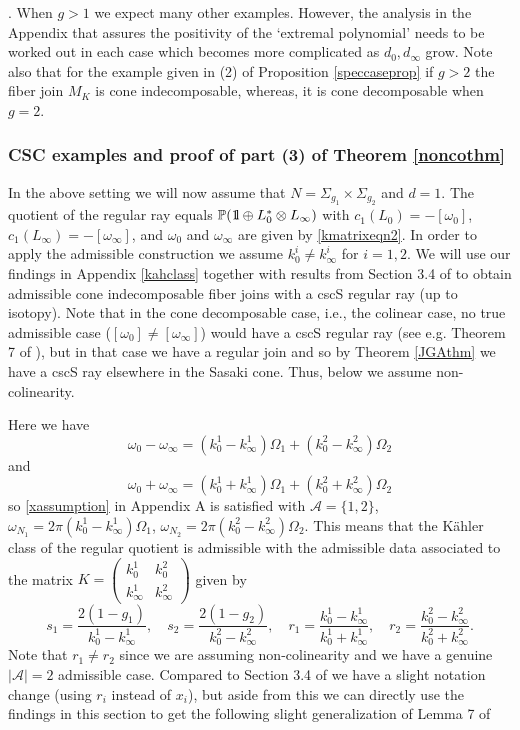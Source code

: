 \documentclass[12pt]{amsart}
\newenvironment{remark}{\medskip \refstepcounter{theorem}
\noindent  {\bf Remark \thetheorem}.\rm}{\,}
\renewcommand{\thetheorem}{\thesection.\arabic{theorem}}
\def\BOne{{\mathchoice {\rm 1\mskip-4mu l} {\rm 1\mskip-4mu l}
                          {\rm 1\mskip-4.5mu l} {\rm 1\mskip-5mu l}}}
\def\bbp{{\mathbb P}}
\def\grO{\Omega}
\def\grS{\Sigma}
\def\cala{{\mathcal A}}
\begin{document}
\begin{remark}\label{genusrem}
When $g>1$ we expect many other examples. However, the analysis in the Appendix that assures the positivity of the `extremal polynomial' needs to be worked out in each case which becomes more complicated as $d_0,d_\infty$ grow. 
Note also that for the example given in (2) of Proposition \ref{speccaseprop} if $g>2$ the fiber join $M_K$ is cone indecomposable, whereas, it is cone decomposable when $g=2$. 
\end{remark}

\subsubsection{CSC examples and proof of part (3) of Theorem \ref{noncothm}}
In the above setting we will now assume that $N=\grS_{g_1}\times \grS_{g_2}$ and $d=1$. The quotient of the regular ray equals
$\bbp(\BOne \oplus L^*_0\otimes L_\infty)$ with $c_1(L_0)=-[\omega_0]$, $c_1(L_\infty)=-[\omega_\infty]$, and $\omega_0$ and $\omega_\infty$ are given by \eqref{kmatrixeqn2}. In order to apply the admissible construction we assume $k^i_0\neq k^i_\infty$ for $i=1,2$. We will use our findings in Appendix \ref{kahclass} together with results from Section 3.4 of \cite{ACGT08} to obtain admissible cone indecomposable fiber joins with a cscS regular ray (up to isotopy). Note that in the cone decomposable case, i.e., the colinear case, no true admissible case ($[\omega_0]\neq [\omega_\infty]$) would have a cscS regular ray (see e.g. Theorem 7 of \cite{ACGT08}), but in that case we have a regular join and so by Theorem \ref{JGAthm} we have a cscS ray elsewhere in the Sasaki cone. 
Thus, below we assume non-colinearity.

Here we have 
$$\omega_0-\omega_\infty= (k^1_0-k^1_\infty)\grO_1 +(k^2_0-k^2_\infty)\grO_2$$
and
$$\omega_0+\omega_\infty= (k^1_0+k^1_\infty)\grO_1 +(k^2_0+k^2_\infty)\grO_2$$
so \eqref{xassumption} in Appendix A is satisfied with $\cala=\{1,2\}$,
$\omega_{N_1}= 2\pi (k^1_0-k^1_\infty)\grO_1$, $\omega_{N_2}= 2\pi(k^2_0-k^2_\infty)\grO_2$.
This means that the K\"ahler class of the regular quotient is admissible with the admissible data associated to the matrix 
$K= \begin{pmatrix}
     k^1_0 & k^2_0 \\
k^1_{\infty} & k^2_{\infty}
\end{pmatrix}$
given by
\begin{equation}\label{admdata}
s_1=\frac{2(1-g_1)}{k^1_0-k^1_\infty},\quad s_2=\frac{2(1-g_2)}{k^2_0-k^2_\infty}, \quad r_1=\frac{k^1_0-k^1_\infty}{k^1_0+k^1_\infty}, \quad r_2=\frac{k^2_0-k^2_\infty}{k^2_0+k^2_\infty}.
\end{equation}
Note that $r_1\neq r_2$ since we are assuming non-colinearity and we have a genuine $|\cala|=2$ admissible case.
Compared to Section 3.4 of \cite{ACGT08} we have a slight notation change (using $r_i$ instead of $x_i$), but aside from this we can directly 
use the findings in this section to get the following slight generalization of Lemma 7 of \cite{ACGT08}
\end{document}
